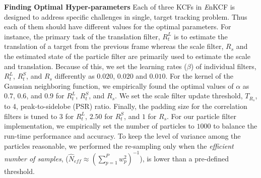 \documentclass[10pt,twocolumn,letterpaper]{article}
\begin{document}
\textbf{Finding Optimal Hyper-parameters} Each of three KCFs in {\it
  E}nKCF is designed to address specific challenges in single, target
tracking problem. Thus each of them should have different values for
the optimal parameters. For instance, the primary task of the
translation filter, $R_{t}^{L}$ is to estimate the translation of a
target from the previous frame whereas the scale filter, $R_{s}$ and
the estimated state of the particle filter are primarily used to
estimate the scale and translation. Because of this, we set the
learning rates ($\beta$) of individual filters, $R_{t}^{L}$,
$R_{t}^{S}$, and $R_{s}$ differently as $0.020$, $0.020$ and
$0.010$. For the kernel of the Gaussian neighboring function, we
empirically found the optimal values of $\alpha$ as $0.7$, $0.6$, and
$0.9$ for $R_{t}^{L}$, $R_{t}^{S}$, and $R_{s}$. We set the scale
filter update threshold, $T_{R_{s}}$, to 4, peak-to-sidelobe (PSR)
ratio. Finally, the padding size for the correlation filters is tuned
to $3$ for $R_{t}^{L}$, $2.50$ for $R_{t}^{S}$, and $1$ for
$R_{s}$. For our particle filter implementation, we empirically set
the number of particles to $1000$ to balance the run-time performance
and accuracy. To keep the level of variance among the particles
reasonable, we performed the re-sampling only when the
\textit{efficient number of samples}, ($ \hat{N}_{eff} \approx
(\sum_{p=1}^{P}w_{p}^{2})^{-1} $), is lower than a pre-defined
threshold.
\end{document}

